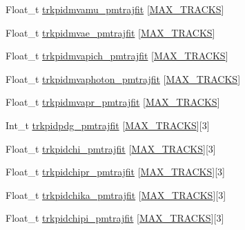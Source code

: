 \begin{DoxyCompactItemize}
\item 
Float\-\_\-t \hyperlink{classanatree_abdc0b461dd4ae741e79dc44b43613f8b}{trkpidmvamu\-\_\-pmtrajfit} \mbox{[}\hyperlink{anatree__core__v09410002_8h_a327fd4e796e4a0d78947524c96e4362e}{M\-A\-X\-\_\-\-T\-R\-A\-C\-K\-S}\mbox{]}
\item 
Float\-\_\-t \hyperlink{classanatree_aa63656e8d9ace690034a03fb6bb67c8a}{trkpidmvae\-\_\-pmtrajfit} \mbox{[}\hyperlink{anatree__core__v09410002_8h_a327fd4e796e4a0d78947524c96e4362e}{M\-A\-X\-\_\-\-T\-R\-A\-C\-K\-S}\mbox{]}
\item 
Float\-\_\-t \hyperlink{classanatree_a312cdb3d468947bcf063fb4a03b127d5}{trkpidmvapich\-\_\-pmtrajfit} \mbox{[}\hyperlink{anatree__core__v09410002_8h_a327fd4e796e4a0d78947524c96e4362e}{M\-A\-X\-\_\-\-T\-R\-A\-C\-K\-S}\mbox{]}
\item 
Float\-\_\-t \hyperlink{classanatree_ac5425c12babfab45fa71d1ea8b65d0d8}{trkpidmvaphoton\-\_\-pmtrajfit} \mbox{[}\hyperlink{anatree__core__v09410002_8h_a327fd4e796e4a0d78947524c96e4362e}{M\-A\-X\-\_\-\-T\-R\-A\-C\-K\-S}\mbox{]}
\item 
Float\-\_\-t \hyperlink{classanatree_a2a02ebfb204d49befb28b466a2720f9e}{trkpidmvapr\-\_\-pmtrajfit} \mbox{[}\hyperlink{anatree__core__v09410002_8h_a327fd4e796e4a0d78947524c96e4362e}{M\-A\-X\-\_\-\-T\-R\-A\-C\-K\-S}\mbox{]}
\item 
Int\-\_\-t \hyperlink{classanatree_a6b025f1c33d29e35c07d799a350af0b0}{trkpidpdg\-\_\-pmtrajfit} \mbox{[}\hyperlink{anatree__core__v09410002_8h_a327fd4e796e4a0d78947524c96e4362e}{M\-A\-X\-\_\-\-T\-R\-A\-C\-K\-S}\mbox{]}\mbox{[}3\mbox{]}
\item 
Float\-\_\-t \hyperlink{classanatree_a998285285751cf5584e4831fd07fe150}{trkpidchi\-\_\-pmtrajfit} \mbox{[}\hyperlink{anatree__core__v09410002_8h_a327fd4e796e4a0d78947524c96e4362e}{M\-A\-X\-\_\-\-T\-R\-A\-C\-K\-S}\mbox{]}\mbox{[}3\mbox{]}
\item 
Float\-\_\-t \hyperlink{classanatree_a7bbaa141c9a2a46a901631a1bcc877b8}{trkpidchipr\-\_\-pmtrajfit} \mbox{[}\hyperlink{anatree__core__v09410002_8h_a327fd4e796e4a0d78947524c96e4362e}{M\-A\-X\-\_\-\-T\-R\-A\-C\-K\-S}\mbox{]}\mbox{[}3\mbox{]}
\item 
Float\-\_\-t \hyperlink{classanatree_a6a05fa8f75ccecb35ac811b5348bf5ee}{trkpidchika\-\_\-pmtrajfit} \mbox{[}\hyperlink{anatree__core__v09410002_8h_a327fd4e796e4a0d78947524c96e4362e}{M\-A\-X\-\_\-\-T\-R\-A\-C\-K\-S}\mbox{]}\mbox{[}3\mbox{]}
\item 
Float\-\_\-t \hyperlink{classanatree_a2487641b188b3ff39acbd6165a77b4f1}{trkpidchipi\-\_\-pmtrajfit} \mbox{[}\hyperlink{anatree__core__v09410002_8h_a327fd4e796e4a0d78947524c96e4362e}{M\-A\-X\-\_\-\-T\-R\-A\-C\-K\-S}\mbox{]}\mbox{[}3\mbox{]}

\end{DoxyCompactItemize}
